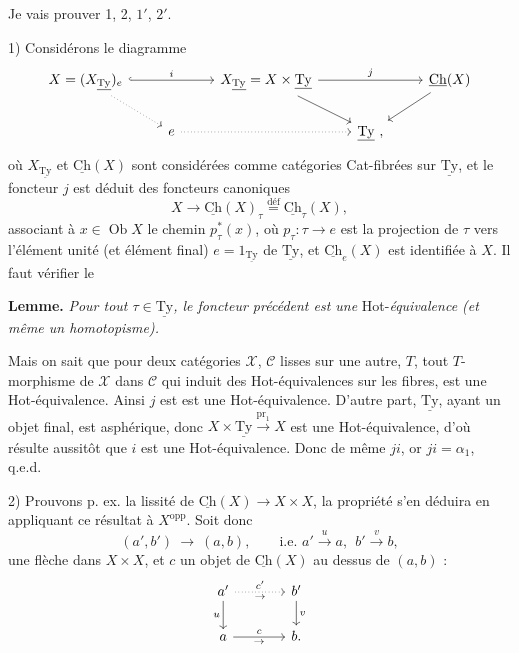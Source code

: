 \documentclass[11pt]{article}
\newcommand{\printedpage}[1]{\marginpar{\footnotesize p.~#1}}
\newcommand{\msp}[1]{\marginpar{\footnotesize [#1]}}
\newcommand{\Ch}{\underline{\mathrm{Ch}}}
\newcommand{\Ty}{\underline{\mathrm{Ty}}}
\newcommand{\cC}{\mathcal{C}}
\newcommand{\cX}{\mathcal{X}}
\newcommand{\Ob}{\operatorname{Ob}}
\begin{document}
\printedpage{100}
\msp{page 160}
Je vais prouver 1, 2, $1'$, $2'$.

1) Considérons le diagramme
\[
\begin{tikzcd}
X = (X_{\Ty})_e \ar[rr,hook,"i"] \ar[dr,dotted] & & X_{\Ty} = X \times \Ty \ar[rr,"j"] \ar[dr] & & \Ch(X) \ar[dl] \\
& e \ar[rr,dotted] & & \Ty\ , &
\end{tikzcd}
\]
où $X_{\Ty}$ et $\Ch(X)$ sont considérées comme catégories Cat-fibrées sur $\Ty$, et le foncteur $j$ est déduit des foncteurs canoniques
\[
X \longrightarrow \Ch(X)_{\tau} \overset{\text{déf}}{=} \Ch_{\tau}(X),
\]
associant à $x \in \Ob X$ le chemin $p_{\tau}^{*}(x)$, où $p_{\tau} : \tau \longrightarrow e$ est la projection de $\tau$ vers l'élément unité (et élément final) $e = 1_{\Ty}$ de $\Ty$, et $\Ch_{e}(X)$ est identifiée à $X$. Il faut vérifier le

\textbf{Lemme.} \textit{Pour tout $\tau \in \Ty$, le foncteur précédent est une} Hot-\textit{équivalence (et même un homotopisme).}

Mais on sait que pour deux catégories $\cX$, $\cC$ lisses sur une autre, $T$, tout $T$-morphisme de $\cX$ dans $\cC$ qui induit des Hot-équivalences sur les fibres, est une Hot-équivalence. Ainsi $j$ est
\msp{page 161}
est une Hot-équivalence. D'autre part, $\Ty$, ayant un objet final, est asphérique, donc %
$X \times \Ty \xrightarrow{\mathrm{pr}_1} X$ est une Hot-équivalence, d'où résulte aussitôt que $i$ est une Hot-équivalence. Donc de même $ji$, or $ji = \alpha_1$, q.e.d.

2) Prouvons p. ex. la lissité de $\Ch(X) \longrightarrow X \times X$, la propriété s'en déduira en appliquant ce résultat à $X^{\mathrm{opp}}$. Soit donc
\[
(a',b') \ \longrightarrow\ (a,b), \qquad \text{i.e. } a' \xrightarrow{u} a,\ \ b' \xrightarrow{v} b,
\]
une flèche dans $X \times X$, et $c$ un objet de $\Ch(X)$ au dessus de $(a,b)$ :
\[
\begin{tikzcd}[column sep=large]
a' \ar[r,dotted,"c'","\scriptstyle\rightarrow"'] \ar[d,"u"'] & b' \ar[d,"v"] \\
a \ar[r,"c","\scriptstyle\rightarrow"'] & b.
\end{tikzcd}
\]
\end{document}

